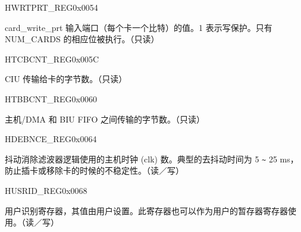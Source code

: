 \begin{register}{H}{WRTPRT\_REG}{0x0054}\label{regdesc:WRTPRTREG}
%
%
\regnewline%
\begin{regdesc}\begin{reglist}
\item [WRITE\_PROTECT] card\_write\_prt 输入端口（每个卡一个比特）的值。1 表示写保护。只有 NUM\_CARDS 的相应位被执行。（只读）
\end{reglist}\end{regdesc}
\end{register}


\begin{register}{H}{TCBCNT\_REG}{0x005C}\label{regdesc:TCBCNTREG}
%
\regnewline%
\begin{regdesc}\begin{reglist}
\item [TCBCNT\_REG] CIU 传输给卡的字节数。（只读）
\end{reglist}\end{regdesc}
\end{register}


\begin{register}{H}{TBBCNT\_REG}{0x0060}\label{regdesc:TBBCNTREG}
%
\regnewline%
\begin{regdesc}\begin{reglist}
\item [TBBCNT\_REG]主机/DMA 和 BIU FIFO 之间传输的字节数。（只读）
\end{reglist}\end{regdesc}
\end{register}


\begin{register}{H}{DEBNCE\_REG}{0x0064}\label{regdesc:DEBNCEREG}
%
%
\regnewline%
\begin{regdesc}\begin{reglist}
\item [DEBOUNCE\_COUNT]抖动消除滤波器逻辑使用的主机时钟 (clk) 数。典型的去抖动时间为 5 \verb+~+ 25 ms，防止插卡或移除卡的时候的不稳定性。（读／写）
\end{reglist}\end{regdesc}
\end{register}


\begin{register}{H}{USRID\_REG}{0x0068}\label{regdesc:USRIDREG}
%
\regnewline%
\begin{regdesc}\begin{reglist}
\item [USRID\_REG]用户识别寄存器，其值由用户设置。此寄存器也可以作为用户的暂存器寄存器使用。（读／写）
\end{reglist}\end{regdesc}
\end{register}


